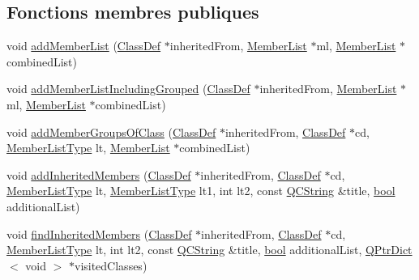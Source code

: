 \subsection*{Fonctions membres publiques}
\begin{DoxyCompactItemize}
\item 
void \hyperlink{class_inherited_member_info_list_context_1_1_private_a0857df88d1a6bb960bebce65eb0f7cb7}{add\+Member\+List} (\hyperlink{class_class_def}{Class\+Def} $\ast$inherited\+From, \hyperlink{class_member_list}{Member\+List} $\ast$ml, \hyperlink{class_member_list}{Member\+List} $\ast$combined\+List)
\item 
void \hyperlink{class_inherited_member_info_list_context_1_1_private_a81629ce8656c02c85ca33400db66a452}{add\+Member\+List\+Including\+Grouped} (\hyperlink{class_class_def}{Class\+Def} $\ast$inherited\+From, \hyperlink{class_member_list}{Member\+List} $\ast$ml, \hyperlink{class_member_list}{Member\+List} $\ast$combined\+List)
\item 
void \hyperlink{class_inherited_member_info_list_context_1_1_private_a91f0382e83503c98dfe9f08574f269d7}{add\+Member\+Groups\+Of\+Class} (\hyperlink{class_class_def}{Class\+Def} $\ast$inherited\+From, \hyperlink{class_class_def}{Class\+Def} $\ast$cd, \hyperlink{types_8h_abe8ad5992f8938a28f918f51b199aa19}{Member\+List\+Type} lt, \hyperlink{class_member_list}{Member\+List} $\ast$combined\+List)
\item 
void \hyperlink{class_inherited_member_info_list_context_1_1_private_ad9abba0149a9bad4928c6c52b878a4de}{add\+Inherited\+Members} (\hyperlink{class_class_def}{Class\+Def} $\ast$inherited\+From, \hyperlink{class_class_def}{Class\+Def} $\ast$cd, \hyperlink{types_8h_abe8ad5992f8938a28f918f51b199aa19}{Member\+List\+Type} lt, \hyperlink{types_8h_abe8ad5992f8938a28f918f51b199aa19}{Member\+List\+Type} lt1, int lt2, const \hyperlink{class_q_c_string}{Q\+C\+String} \&title, \hyperlink{qglobal_8h_a1062901a7428fdd9c7f180f5e01ea056}{bool} additional\+List)
\item 
void \hyperlink{class_inherited_member_info_list_context_1_1_private_a0083eb0644b03f1801aa80ea3c250735}{find\+Inherited\+Members} (\hyperlink{class_class_def}{Class\+Def} $\ast$inherited\+From, \hyperlink{class_class_def}{Class\+Def} $\ast$cd, \hyperlink{types_8h_abe8ad5992f8938a28f918f51b199aa19}{Member\+List\+Type} lt, int lt2, const \hyperlink{class_q_c_string}{Q\+C\+String} \&title, \hyperlink{qglobal_8h_a1062901a7428fdd9c7f180f5e01ea056}{bool} additional\+List, \hyperlink{class_q_ptr_dict}{Q\+Ptr\+Dict}$<$ void $>$ $\ast$visited\+Classes)
\end{DoxyCompactItemize}
